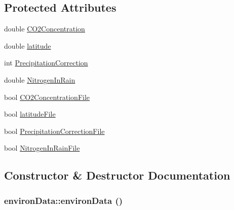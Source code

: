 \subsection*{Protected Attributes}
\begin{DoxyCompactItemize}
\item 
double \hyperlink{classenviron_data_a3dc8ee3621f212db9a491f8c5f89d2f1}{CO2Concentration}
\item 
double \hyperlink{classenviron_data_a70f37280fddf194d0c6f47e9391a0980}{latitude}
\item 
int \hyperlink{classenviron_data_a1c8eb583f4a0fba58b4ca1954013e234}{PrecipitationCorrection}
\item 
double \hyperlink{classenviron_data_a0007598ad4764562fe1b1ae6cf058a89}{NitrogenInRain}
\item 
bool \hyperlink{classenviron_data_a697f18bb8854f8076d40ac5e3d664ddf}{CO2ConcentrationFile}
\item 
bool \hyperlink{classenviron_data_a4736bdd9c884ebe5ff74ed93891bc748}{latitudeFile}
\item 
bool \hyperlink{classenviron_data_a6ae5ddf5e5f44a783cf17f02a68783d4}{PrecipitationCorrectionFile}
\item 
bool \hyperlink{classenviron_data_ace78da36801f5240687bc412ce0dbd4b}{NitrogenInRainFile}
\end{DoxyCompactItemize}


\subsection{Constructor \& Destructor Documentation}
\hypertarget{classenviron_data_a301bd573b37f5ef97e3820431a953c5a}{
\subsubsection[{environData}]{\setlength{\rightskip}{0pt plus 5cm}environData::environData ()}}
\label{classenviron_data_a301bd573b37f5ef97e3820431a953c5a}



